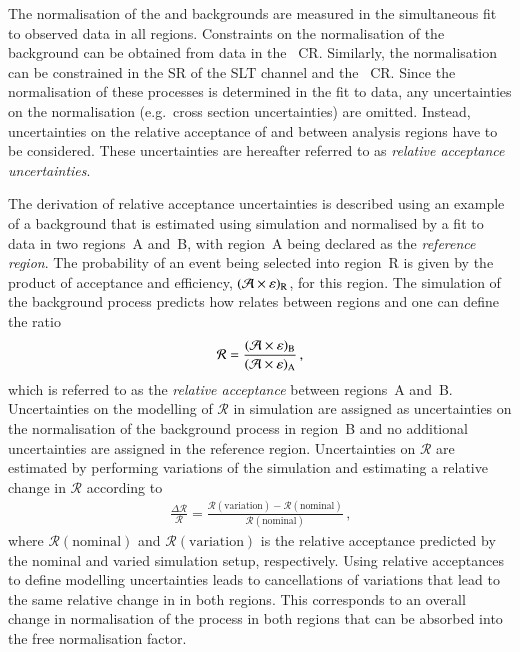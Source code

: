 The normalisation of the \ZHF and \ttbar backgrounds are measured in the
simultaneous fit to observed data in all regions. Constraints on the
normalisation of the \ZHF background can be obtained from data in the
\ZHF~CR. Similarly, the \ttbar normalisation can be constrained in the SR of the
\lephad SLT channel and the \ZHF~CR. Since the normalisation of these processes
is determined in the fit to data, any uncertainties on the normalisation
(e.g.~cross section uncertainties) are omitted. Instead, uncertainties on the
relative acceptance of \ZHF and \ttbar between analysis regions have to be
considered. These uncertainties are hereafter referred to as \emph{relative
  acceptance uncertainties}.

The derivation of relative acceptance uncertainties is described using an
example of a background that is estimated using simulation and normalised by a
fit to data in two regions~A and~B, with region~A being declared as the
\emph{reference region}. The probability of an event being selected into
region~R is given by the product of acceptance and efficiency,
$(\mathcal{A} \times \varepsilon)_{\text{R}}$, for this region. The simulation of the background
process predicts how \AccTimesEff relates between regions and one can define the
ratio
\begin{align*}
  \mathcal{R} = \frac{(\mathcal{A} \times \varepsilon)_{\text{B}}}{(\mathcal{A} \times \varepsilon)_{\text{A}}} \,\text{,}
\end{align*}
which is referred to as the \emph{relative acceptance} between regions~A
and~B. Uncertainties on the modelling of $\mathcal{R}$ in simulation are
assigned as uncertainties on the normalisation of the background process in
region~B and no additional uncertainties are assigned in the reference
region. Uncertainties on $\mathcal{R}$ are estimated by performing variations of
the simulation and estimating a relative change in $\mathcal{R}$ according to
\begin{align}
  \frac{\Delta \mathcal{R}}{\mathcal{R}} = \frac{\mathcal{R}(\text{variation}) - \mathcal{R}(\text{nominal})}{\mathcal{R}(\text{nominal})} \,\text{,}
  \label{eq:relative_acceptance_uncertainty}
\end{align}
where $\mathcal{R}(\text{nominal})$ and $\mathcal{R}(\text{variation})$ is the
relative acceptance predicted by the nominal and varied simulation setup,
respectively. Using relative acceptances to define modelling uncertainties leads
to cancellations of variations that lead to the same relative change in
\AccTimesEff in both regions. This corresponds to an overall change in
normalisation of the process in both regions that can be absorbed into the free
normalisation factor.


